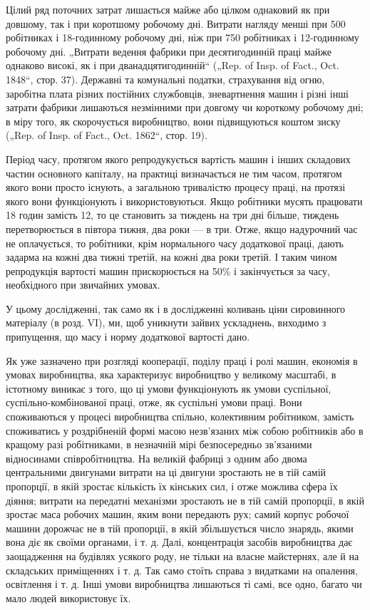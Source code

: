 Цілий ряд поточних затрат лишається майже або цілком
однаковий як при довшому, так і при коротшому робочому дні.
Витрати нагляду менші при 500 робітниках і 18-годинному робочому
дні, ніж при 750 робітниках і 12-годинному робочому дні.
„Витрати ведення фабрики при десятигодинній праці майже однаково
високі, як і при дванадцятигодинній“ („Rep. of Insp. of
Fact., Oct. 1848“, стор. 37). Державні та комунальні податки,
страхування від огню, заробітна плата різних постійних службовців,
зневартнення машин і різні інші затрати фабрики лишаються
незмінними при довгому чи короткому робочому дні;
в міру того, як скорочується виробництво, вони підвищуються
коштом зиску („Rep. of Insp. of Fact., Oct. 1862“, стор. 19).

Період часу, протягом якого репродукується вартість машин
і інших складових частин основного капіталу, на практиці визначається
не тим часом, протягом якого вони просто існують,
а загальною тривалістю процесу праці, на протязі якого вони
функціонують і використовуються. Якщо робітники мусять працювати
18 годин замість 12, то це становить за тиждень на три
дні більше, тиждень перетворюється в півтора тижня, два
роки — в три. Отже, якщо надурочний час не оплачується, то
робітники, крім нормального часу додаткової праці, дають задарма
на кожні два тижні третій, на кожні два роки третій.
І таким чином репродукція вартості машин прискорюється на 50\%
і закінчується за  часу, необхідного при звичайних умовах.

У цьому дослідженні, так само як і в дослідженні коливань
ціни сировинного матеріалу (в розд. VI), ми, щоб уникнути
зайвих ускладнень, виходимо з припущення, що масу і норму
додаткової вартості дано.

Як уже зазначено при розгляді кооперації, поділу праці
і ролі машин, економія в умовах виробництва, яка характеризує
виробництво у великому масштабі, в істотному виникає з того,
що ці умови функціонують як умови суспільної, суспільно-комбінованої
праці, отже, як суспільні умови праці. Вони
споживаються у процесі виробництва спільно, колективним робітником,
замість споживатись у роздрібненій формі масою
незв’язаних між собою робітників або в кращому разі робітниками,
в незначній мірі безпосередньо зв’язаними відносинами співробітництва.
На великій фабриці з одним або двома центральними
двигунами витрати на ці двигуни зростають не в тій самій пропорції,
в якій зростає кількість їх кінських сил, і отже можлива сфера
їх діяння; витрати на передатні механізми зростають не в тій самій
пропорції, в якій зростає маса робочих машин, яким вони передають
рух; самий корпус робочої машини дорожчає не в тій
пропорції, в якій збільшується число знарядь, якими вона діє
як своїми органами, і т. д. Далі, концентрація засобів виробництва
дає заощадження на будівлях усякого роду, не тільки
на власне майстернях, але й на складських приміщеннях і т. д.
Так само стоїть справа з видатками на опалення, освітлення
і т. д. Інші умови виробництва лишаються ті самі, все одно,
багато чи мало людей використовує їх.

